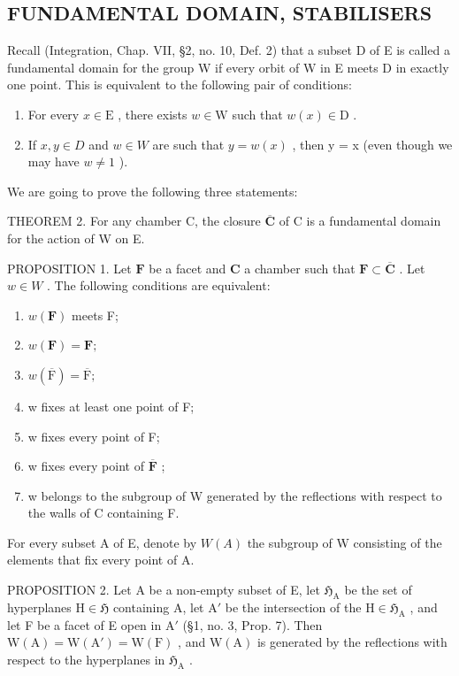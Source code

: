\subsection{FUNDAMENTAL DOMAIN, STABILISERS}

Recall (Integration, Chap. VII, §2, no. 10, Def. 2) that a subset D of E is called a fundamental domain for the group W if every orbit of W in E meets D in exactly one point. This is equivalent to the following pair of conditions:

\begin{enumerate}
\def\labelenumi{\alph{enumi})}
\item
  For every \(x \in \mathrm{E}\) , there exists \(w \in \mathrm{W}\) such that \(w(x) \in \mathrm{D}\) .
\item
  If \(x, y \in D\) and \(w \in W\) are such that \(y = w(x)\) , then y = x (even though we may have \(w \neq 1\) ).
\end{enumerate}

We are going to prove the following three statements:

THEOREM 2. For any chamber C, the closure \(\overline{\mathbf{C}}\) of C is a fundamental domain for the action of W on E.

PROPOSITION 1. Let \(\mathbf{F}\) be a facet and \(\mathbf{C}\) a chamber such that \(\mathbf{F} \subset \overline{\mathbf{C}}\) . Let \(w \in W\) . The following conditions are equivalent:

\begin{enumerate}
\def\labelenumi{(\roman{enumi})}
\item
  \(w(\mathbf{F})\) meets F;
\item
  \(w(\mathbf{F}) = \mathbf{F};\)
\item
  \(w(\overline{\mathrm{F}}) = \overline{\mathrm{F}};\)
\item
  w fixes at least one point of F;
\item
  w fixes every point of F;
\item
  w fixes every point of \(\overline{\mathbf{F}}\) ;
\item
  w belongs to the subgroup of W generated by the reflections with respect to the walls of C containing F.
\end{enumerate}

For every subset A of E, denote by \(W(A)\) the subgroup of W consisting of the elements that fix every point of A.

PROPOSITION 2. Let A be a non-empty subset of E, let \(\mathfrak{H}_{\mathrm{A}}\) be the set of hyperplanes \(\mathrm{H} \in \mathfrak{H}\) containing A, let \(\mathrm{A}'\) be the intersection of the \(\mathrm{H} \in \mathfrak{H}_{\mathrm{A}}\) , and let F be a facet of E open in \(\mathrm{A}'\) (§1, no. 3, Prop. 7). Then \(\mathrm{W(A)} = \mathrm{W(A')} = \mathrm{W(F)}\) , and \(\mathrm{W(A)}\) is generated by the reflections with respect to the hyperplanes in \(\mathfrak{H}_{\mathrm{A}}\) .

